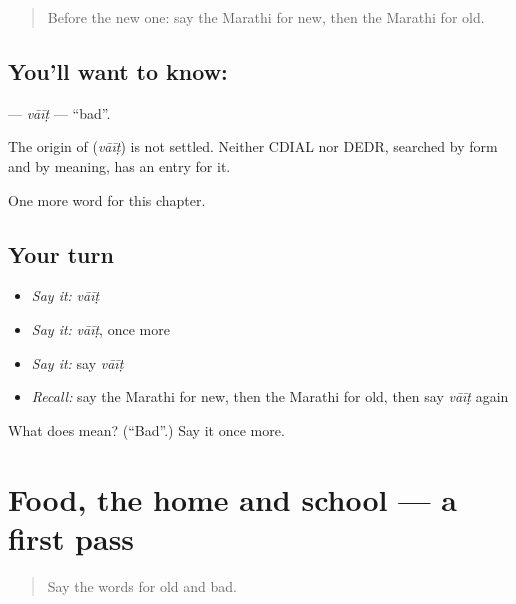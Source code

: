 \begin{quote}
Before the new one: say the Marathi for new, then the Marathi for old.
\end{quote}

\subsection*{You'll want to know: }
\textbf{} — \emph{vāīṭ} — \textquotedblleft{}bad\textquotedblright{}.

\begin{cousinweb}
The origin of \textbf{} (\emph{vāīṭ}) is not settled. Neither CDIAL nor DEDR, searched by form and by meaning, has an entry for it.
\end{cousinweb}

\begin{grammarlens}[title={What you've built}]
One more word for this chapter.
\end{grammarlens}

\subsection*{Your turn}
\begin{itemize}
\raggedright
  \item \emph{Say it:} \emph{vāīṭ}
  \item \emph{Say it:} \emph{vāīṭ}, once more
  \item \emph{Say it:} say \emph{vāīṭ}
  \item \emph{Recall:} say the Marathi for new, then the Marathi for old, then say \emph{vāīṭ} again
\end{itemize}

\begin{tcolorbox}[breakable,colback=teal!4,colframe=teal!35!black,title={Before you move on}]
What does  mean? (\textquotedblleft{}Bad\textquotedblright{}.) Say it once more.
\end{tcolorbox}
\section[(dialogue)]{Food, the home and school — a first pass}

\label{lesson:MR-R103-first-pass-food-the-home-and-school}



\begin{quote}
Say the words for old and bad.
\end{quote}

